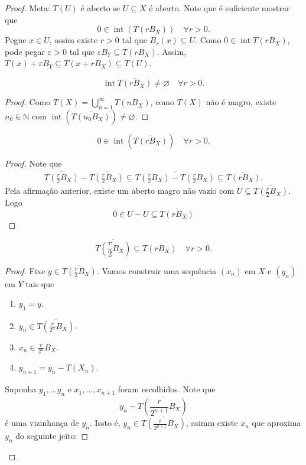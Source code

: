 \documentclass[portuguese]{article}
\theoremstyle{definition}
\newcommand{\N}{\mathbb{N}}
\begin{document}
	\begin{proof}
		Meta: $T(U)$ é aberto se $U\subseteq X$ é aberto. Note que é suficiente mostrar que
		\[0\in\operatorname{int}(T(rB_X))\quad\forall r>0.\]
		Pegue $x\in U$, assim existe $r>0$ tal que $B_r(x)\subseteq U$. Como $0\in\operatorname{int}T(rB_X)$, pode pegar $\varepsilon>0$ tal que $\varepsilon B_Y\subseteq T(rB_X)$. Assim, $T(x)+\varepsilon B_Y\subseteq T(x+rB_X)\subseteq T(U)$.
		\begin{af*}
			\[\operatorname{int}\overline{T(rB_X)}\neq\varnothing\quad\forall r>0.\]
		\end{af*}
		\begin{proof}
			Como $T(X)=\bigcup_{n=1}^\infty T(nB_X)$, como $T(X)$ não é magro, existe $n_0\in\N$ com $\operatorname{int}(\overline{T(n_0B_X)})\neq\varnothing$.
		\end{proof}
		\begin{af*}
			\[0\in\operatorname{int}(\overline{T(rB_X)})\quad\forall r>0.\]
		\end{af*}
		\begin{proof}
			Note que
			\begin{align*}
				\overline{T(\frac{r}{2}B_X)}-\overline{T(\frac{r}{2}B_X)}\subseteq \overline{T\left(\frac{r}{2}B_X\right)-T\left(\frac{r}{2}B_X\right)}\subseteq\overline{T(rB_X)}.
			\end{align*}
			Pela afirmação anterior, existe um aberto magro não vazío com $U\subseteq\overline{T\left(\frac{r}{2}B_X\right)}$. Logo
			\[0\in U-U\subseteq\overline{T(rB_X)}\]
		\end{proof}
		\begin{af*}
			\[\overline{T\left(\frac{r}{2}B_X\right)}\subseteq T(rB_X)\quad\forall r>0.\]
		\end{af*}
		\begin{proof}
			Fixe $y\in\overline{T\left(\frac{r}{2}B_X\right)}$. Vamos construir uma sequência $(x_n)$ em $X$ e $(y_n)$ em $Y$ tais que
			\begin{enumerate}
				\item $y_1=y$.
				\item $y_n\in\overline{T\left(\frac{r}{2^n}B_X\right)}$.
				\item $x_n\in\frac{r}{2^n}B_X$.
				\item $y_{n+1}=y_n-T(X_n)$.
			\end{enumerate}
			Suponha $y_1,\ldots y_n$ e $x_1,\ldots, x_{n+1}$ foram escolhidos. Note que
			\[y_n-\overline{T\left(\frac{r}{2^{n+1}}B_X\right)}\]
			é uma vizinhança de $y_n$. Issto é, $y_n\in\overline{T\left(\frac{r}{2^{n+1}}B_X\right)}$, asimm existe $x_n$ que aproxima $y_n$ do seguinte jeito:

\end{proof}
\end{proof}
\end{document}
